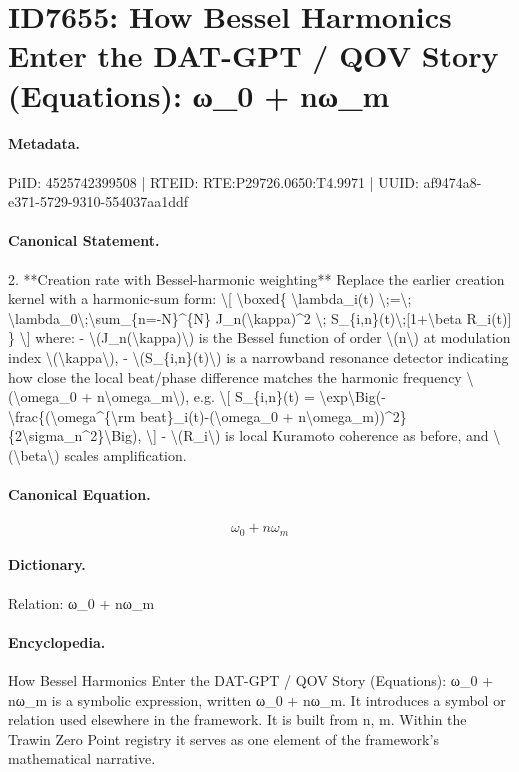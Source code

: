 \section*{ID7655: How Bessel Harmonics Enter the DAT-GPT / QOV Story (Equations): ω\_0 + nω\_m}
\paragraph{Metadata.}
PiID: 4525742399508 | RTEID: RTE:P29726.0650:T4.9971 | UUID: af9474a8-e371-5729-9310-554037aa1ddf

\paragraph{Canonical Statement.}
2. **Creation rate with Bessel-harmonic weighting** Replace the earlier creation kernel with a harmonic-sum form: \textbackslash{}[ \textbackslash{}boxed\{ \textbackslash{}lambda\_i(t) \textbackslash{};=\textbackslash{}; \textbackslash{}lambda\_0\textbackslash{};\textbackslash{}sum\_\{n=-N\}\textasciicircum{}\{N\} J\_n(\textbackslash{}kappa)\textasciicircum{}2 \textbackslash{}; S\_\{i,n\}(t)\textbackslash{};[1+\textbackslash{}beta R\_i(t)] \} \textbackslash{}] where: - \textbackslash{}(J\_n(\textbackslash{}kappa)\textbackslash{}) is the Bessel function of order \textbackslash{}(n\textbackslash{}) at modulation index \textbackslash{}(\textbackslash{}kappa\textbackslash{}), - \textbackslash{}(S\_\{i,n\}(t)\textbackslash{}) is a narrowband resonance detector indicating how close the local beat/phase difference matches the harmonic frequency \textbackslash{}(\textbackslash{}omega\_0 + n\textbackslash{}omega\_m\textbackslash{}), e.g. \textbackslash{}[ S\_\{i,n\}(t) = \textbackslash{}exp\textbackslash{}Big(-\textbackslash{}frac\{(\textbackslash{}omega\textasciicircum{}\{\textbackslash{}rm beat\}\_i(t)-(\textbackslash{}omega\_0 + n\textbackslash{}omega\_m))\textasciicircum{}2\}\{2\textbackslash{}sigma\_n\textasciicircum{}2\}\textbackslash{}Big), \textbackslash{}] - \textbackslash{}(R\_i\textbackslash{}) is local Kuramoto coherence as before, and \textbackslash{}(\textbackslash{}beta\textbackslash{}) scales amplification.

\paragraph{Canonical Equation.}
\[
\omega_0 + n\omega_m
\]

\paragraph{Dictionary.}
Relation: ω\_0 + nω\_m

\paragraph{Encyclopedia.}
How Bessel Harmonics Enter the DAT-GPT / QOV Story (Equations): ω\_0 + nω\_m is a symbolic expression, written ω\_0 + nω\_m. It introduces a symbol or relation used elsewhere in the framework. It is built from n, m. Within the Trawin Zero Point registry it serves as one element of the framework's mathematical narrative.
